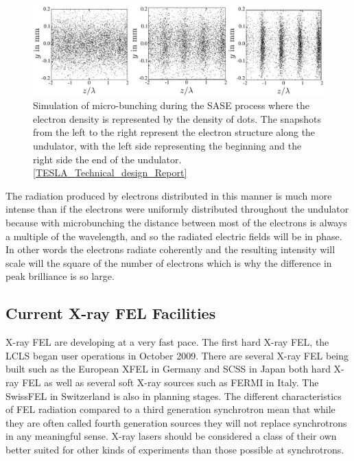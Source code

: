 \begin{figure}[h]
\centering
  \includegraphics[width=1.0 \columnwidth]{micro-bunching.png}
  \caption{Simulation of micro-bunching during the SASE process where the
    electron density is represented by the density of dots. The snapshots
    from the left to the right represent the electron structure along the
    undulator, with the left side representing the beginning and the right side
    the end of the undulator. \ref{TESLA_Technical_design_Report}}
  \label{Fig:Brilliance}
\end{figure}

The radiation produced by electrons distributed in this manner is much more
intense than if the electrons were uniformly distributed throughout the
undulator because with microbunching the distance between most of the electrons is
always a multiple of the wavelength, and so the radiated electric fields will be
in phase. In other words the electrons radiate coherently and the resulting
intensity will scale will the square of the number of electrons which is why the
difference in peak brilliance is so large.

\subsection{Current X-ray FEL Facilities}

X-ray FEL are developing at a very fast pace. The first hard X-ray FEL, the LCLS
began user operations in October 2009.
There are several X-ray FEL
being built such as the European XFEL in Germany and SCSS
in Japan both hard X-ray FEL as well as several soft X-ray sources such as FERMI
in Italy. The SwissFEL in Switzerland is also in planning stages. 
The different characteristics of FEL radiation compared to a third generation synchrotron mean that while they are
often called fourth generation sources they will not replace synchrotrons in any
meaningful sense.
X-ray lasers should be considered a class of
their own better suited for other kinds of experiments than those possible at synchrotrons.

